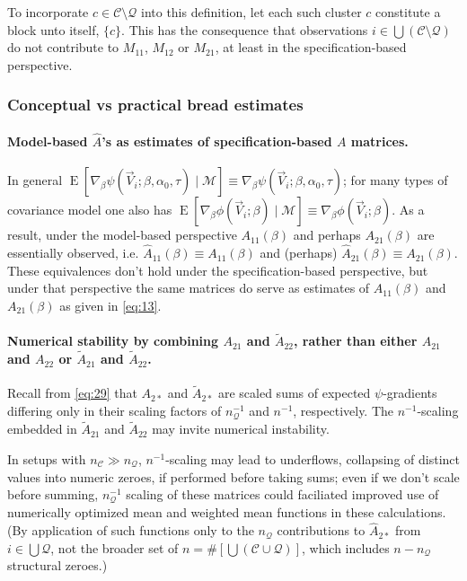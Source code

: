 \documentclass{article}
\newcommand{\EE}{\operatorname{E}}
\begin{document}
To incorporate $c\in \mathcal{C}\setminus\mathcal{Q}$ into this
definition, let each such cluster $c$ constitute a block unto itself,
$\{c\}$. This has the consequence that observations $i
\in \bigcup\left(\mathcal{C}\setminus\mathcal{Q}\right)$ do not
contribute to $M_{11}$, $M_{12}$ or $M_{21}$, at least in the
specification-based perspective.

  \subsubsection{Conceptual vs practical bread estimates} \label{sec:conc-vs-pract}
  \paragraph{Model-based $\hat{A}$'s as estimates of specification-based $A$ matrices.}%
In general $\EE
[\nabla_{\beta}\psi(\vec{V}_{i};  \beta, \alpha_{0},\tau ) \mid \mathcal{M}] \equiv
\nabla_{\beta}\psi(\vec{V}_{i};  \beta, \alpha_{0}, \tau )$; for many types of
covariance model one also has $\EE
[\nabla_{\beta}\phi(\vec{V}_{i};  \beta ) \mid \mathcal{M}] \equiv
\nabla_{\beta}\phi(\vec{V}_{i};  \beta )$. As a result, under the
model-based perspective
$A_{11}(\beta)$ and perhaps $A_{21}(\beta)$ are essentially observed,
i.e.  $\hat{A}_{11}(\beta) \equiv A_{11}(\beta)$ and (perhaps)
$\hat{A}_{21}(\beta) \equiv A_{21}(\beta)$.   These equivalences don't
hold under the specification-based perspective, but under that perspective
the same matrices do serve as estimates of $A_{11}(\beta)$ and
$A_{21}(\beta)$ as given in \eqref{eq:13}.

\paragraph{Numerical stability by combining ${A}_{21}$ and
  $\tilde{A}_{22}$, rather than either
  ${A}_{21}$ and ${A}_{22}$ or $\tilde{A}_{21}$ and $\tilde{A}_{22}$.}
Recall from \eqref{eq:29} that $A_{2*}$ and $\tilde{A}_{2*}$ are
scaled sums of expected $\psi$-gradients differing only in their
scaling factors of $n_{\mathcal{Q}}^{-1}$ and $n^{-1}$,
respectively. The $n^{-1}$-scaling embedded
in $\tilde{A}_{21}$ and $\tilde{A}_{22}$ may invite numerical
instability.

  In setups with
  $n_{\mathcal{C}} \gg n_{\mathcal{Q}}$, $n^{-1}$-scaling may lead to underflows,
  collapsing of distinct values into numeric zeroes, if performed
  before taking sums; even if we don't scale before summing,
  $n_{\mathcal{Q}}^{-1}$ scaling of these matrices could faciliated improved
  use of numerically optimized mean and weighted mean functions in
  these calculations.  (By application of such functions only to the
  $n_{\mathcal{Q}}$ contributions to $\hat{A}_{2*}$  from $i \in \bigcup \mathcal{Q}$, not the broader set of $n = \#\left[\bigcup (\mathcal{C}\cup
    \mathcal{Q}) \right]$, which includes $n - n_{\mathcal{Q}}$ structural
  zeroes.)
\end{document}
